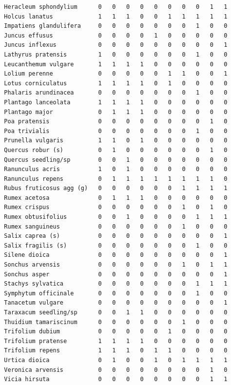\documentclass[
  letterpaper,
  DIV=11,
  numbers=noendperiod]{scrreprt}
\begin{document}
\begin{verbatim}
  Heracleum sphondylium      0   0   0   0   0   0   0   0   1   1
  Holcus lanatus             1   1   1   0   0   1   1   1   1   1
  Impatiens glandulifera     0   0   0   0   0   0   0   1   0   0
  Juncus effusus             0   0   0   0   1   0   0   0   0   0
  Juncus inflexus            0   0   0   0   0   0   0   0   0   1
  Lathyrus pratensis         1   0   0   0   0   0   0   1   0   0
  Leucanthemum vulgare       1   1   1   1   0   0   0   0   0   0
  Lolium perenne             0   0   0   0   0   1   1   0   0   1
  Lotus corniculatus         1   1   1   1   0   1   0   0   0   0
  Phalaris arundinacea       0   0   0   0   0   0   0   1   0   0
  Plantago lanceolata        1   1   1   1   0   0   0   0   0   0
  Plantago major             0   1   1   1   0   0   0   0   0   0
  Poa pratensis              0   0   0   0   0   0   0   0   1   0
  Poa trivialis              0   0   0   0   0   0   0   1   0   0
  Prunella vulgaris          1   1   0   1   0   0   0   0   0   0
  Quercus robur (s)          0   1   0   0   0   0   0   0   1   0
  Quercus seedling/sp        0   0   1   0   0   0   0   0   0   0
  Ranunculus acris           1   0   1   0   0   0   0   0   0   0
  Ranunculus repens          0   1   1   1   1   1   1   1   1   0
  Rubus fruticosus agg (g)   0   0   0   0   0   0   1   1   1   1
  Rumex acetosa              0   1   1   1   0   0   0   0   0   0
  Rumex crispus              0   0   0   0   0   0   1   0   1   0
  Rumex obtusifolius         0   0   1   0   0   0   0   1   1   1
  Rumex sanguineus           0   0   0   0   0   0   1   0   0   0
  Salix caprea (s)           0   0   0   0   0   0   0   0   0   1
  Salix fragilis (s)         0   0   0   0   0   0   0   1   0   0
  Silene dioica              0   0   0   0   0   0   0   0   0   1
  Sonchus arvensis           0   0   0   0   0   0   1   0   1   1
  Sonchus asper              0   0   0   0   0   0   0   0   0   1
  Stachys sylvatica          0   0   0   0   0   0   0   1   1   1
  Symphytum officinale       0   0   0   0   0   0   0   1   0   0
  Tanacetum vulgare          0   0   0   0   0   0   0   0   0   1
  Taraxacum seedling/sp      0   0   1   1   0   0   0   0   0   0
  Thuidium tamariscinum      0   0   0   0   0   0   1   0   0   0
  Trifolium dubium           0   0   0   0   0   1   0   0   0   0
  Trifolium pratense         1   1   1   1   0   0   0   0   0   0
  Trifolium repens           1   1   1   0   1   1   0   0   0   0
  Urtica dioica              0   1   0   0   1   0   1   1   1   1
  Veronica arvensis          0   0   0   0   0   0   0   0   1   0
  Vicia hirsuta              0   0   0   0   0   0   0   0   1   1
\end{verbatim}
\end{document}
